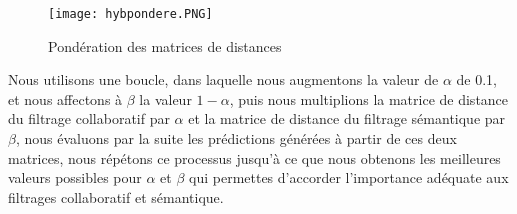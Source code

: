 \begin{figure}[H]
	\centering
	\texttt{[image: hybpondere.PNG]}
	\caption{Pondération des matrices de distances}
	\label{fig:alpha}
	
\end{figure}

Nous utilisons une boucle, dans laquelle nous augmentons la valeur de $\alpha$ de 0.1, et nous affectons à $\beta$ la valeur $1 - \alpha$, puis nous multiplions la matrice de distance du filtrage collaboratif par $\alpha$ et la matrice de distance du filtrage sémantique par $\beta$, nous évaluons par la suite les prédictions générées à partir de ces deux matrices, nous répétons ce processus jusqu'à ce que nous obtenons les meilleures valeurs possibles pour $\alpha$ et $\beta$ qui permettes d'accorder l'importance adéquate aux filtrages collaboratif et sémantique.

